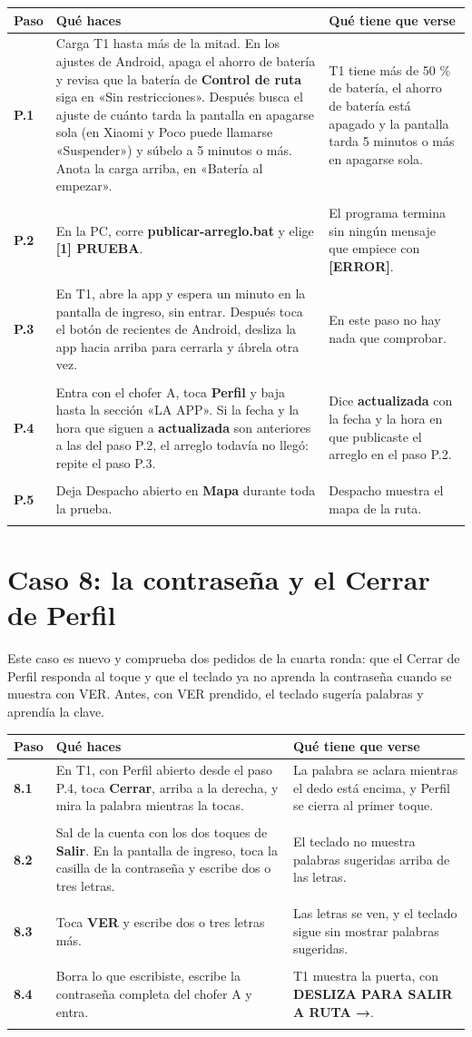 \documentclass[10pt,a4paper]{article}
\makeatletter
\newcommand{\toca}[1]{\textcolor{azul}{\textbf{#1}}}
\newcommand{\pantalla}[1]{\textcolor{marron}{\textbf{#1}}}
\newcommand{\nada}{\textcolor{tenue}{En este paso no hay nada que comprobar.}}
\newcommand{\caja}[2]{\hbox{\vrule height #1 depth 0pt width 0pt #2}}
\newcommand{\campo}[3]{%
  \raisebox{-0.35\height}{\caja{#3}{\TextField[name=#1, width=#2, height=#3, charsize=8pt, bordercolor={0.55 0.6 0.68},
    backgroundcolor={0.965 0.976 0.992}, multiline=true]{}}}}
\newcommand{\resultado}[1]{%
  \caja{9pt}{\ChoiceMenu[radio, name=resultado-#1, width=9pt, height=9pt, radiosymbol=l,
    bordercolor={0.35 0.38 0.45}, default=]{}{OK=ok,FALLA=falla,NO SE PUDO=nopudo}}}
\newcommand{\paso}[4]{%
  \textbf{#1} & #3 & #4 \\*
  \multicolumn{3}{@{\hspace{6pt}}l@{}}{\rule{0pt}{15pt}\small
    \resultado{#2}\hspace{0.4em}Hora:~\campo{hora-#2}{1.7cm}{13pt}\hspace{1.2em}Nota:~\campo{nota-#2}{8.3cm}{22pt}}\\[3pt]
  \hline
}
\newenvironment{pasos}{%
  \begin{longtable}{@{\hspace{6pt}}>{\raggedright\arraybackslash}p{0.9cm}>{\raggedright\arraybackslash}p{7.9cm}>{\raggedright\arraybackslash}p{7.3cm}@{}}
  \rowcolor{cabecera}\textbf{Paso} & \textbf{Qué haces} & \textbf{Qué tiene que verse} \\ \hline
  \endhead
}{\end{longtable}\vspace{-0.6em}}
\makeatother
\begin{document}
\begin{Form}
\begin{pasos}
\paso{P.1}{P-1}{Carga T1 hasta más de la mitad. En los ajustes de Android, apaga el ahorro de batería y revisa que la batería de \toca{Control de ruta} siga en «Sin restricciones». Después busca el ajuste de cuánto tarda la pantalla en apagarse sola (en Xiaomi y Poco puede llamarse «Suspender») y súbelo a 5 minutos o más. Anota la carga arriba, en «Batería al empezar».}{T1 tiene más de 50 \% de batería, el ahorro de batería está apagado y la pantalla tarda 5 minutos o más en apagarse sola.}
\paso{P.2}{P-2}{En la PC, corre \toca{publicar-arreglo.bat} y elige \toca{[1] PRUEBA}.}{El programa termina sin ningún mensaje que empiece con \pantalla{[ERROR]}.}
\paso{P.3}{P-3}{En T1, abre la app y espera un minuto en la pantalla de ingreso, sin entrar. Después toca el botón de recientes de Android, desliza la app hacia arriba para cerrarla y ábrela otra vez.}{\nada}
\paso{P.4}{P-4}{Entra con el chofer A, toca \toca{Perfil} y baja hasta la sección «LA APP». Si la fecha y la hora que siguen a \pantalla{actualizada} son anteriores a las del paso P.2, el arreglo todavía no llegó: repite el paso P.3.}{Dice \pantalla{actualizada} con la fecha y la hora en que publicaste el arreglo en el paso P.2.}
\paso{P.5}{P-5}{Deja Despacho abierto en \toca{Mapa} durante toda la prueba.}{Despacho muestra el mapa de la ruta.}
\end{pasos}

\section{Caso 8: la contraseña y el Cerrar de Perfil}

Este caso es nuevo y comprueba dos pedidos de la cuarta ronda: que el Cerrar de Perfil responda al toque y que el teclado ya no aprenda la contraseña cuando se muestra con VER. Antes, con VER prendido, el teclado sugería palabras y aprendía la clave.

\begin{pasos}
\paso{8.1}{8-1}{En T1, con Perfil abierto desde el paso P.4, toca \toca{Cerrar}, arriba a la derecha, y mira la palabra mientras la tocas.}{La palabra se aclara mientras el dedo está encima, y Perfil se cierra al primer toque.}
\paso{8.2}{8-2}{Sal de la cuenta con los dos toques de \toca{Salir}. En la pantalla de ingreso, toca la casilla de la contraseña y escribe dos o tres letras.}{El teclado no muestra palabras sugeridas arriba de las letras.}
\paso{8.3}{8-3}{Toca \toca{VER} y escribe dos o tres letras más.}{Las letras se ven, y el teclado sigue sin mostrar palabras sugeridas.}
\paso{8.4}{8-4}{Borra lo que escribiste, escribe la contraseña completa del chofer A y entra.}{T1 muestra la puerta, con \pantalla{DESLIZA PARA SALIR A RUTA →}.}
\end{pasos}


\end{Form}
\end{document}
